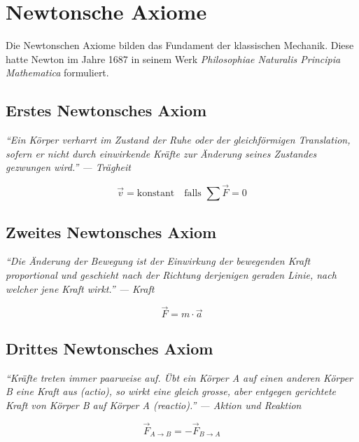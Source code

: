 \chapter{Newtonsche Axiome}
Die Newtonschen Axiome bilden das Fundament der klassischen Mechanik. Diese
hatte Newton im Jahre 1687 in seinem Werk 
\textit{Philosophiae Naturalis Principia Mathematica} formuliert. 

\newpage
\section{Erstes Newtonsches Axiom}
\textit{"`Ein Körper verharrt im Zustand der Ruhe oder der gleichförmigen 
Translation, sofern er nicht durch einwirkende Kräfte zur Änderung seines 
Zustandes gezwungen wird."' --- Trägheit}

\[ \boxed{\vec{v} = \text{konstant}} \quad \text{falls } \sum\vec{F}=0 \]

\section{Zweites Newtonsches Axiom} 
\textit{"`Die Änderung der Bewegung ist der Einwirkung der bewegenden Kraft 
proportional und geschieht nach der Richtung derjenigen geraden Linie, nach
welcher jene Kraft wirkt."' --- Kraft}

\[ \boxed{\vec{F} = m \cdot \vec{a}} \]

\section{Drittes Newtonsches Axiom}
\textit{"`Kräfte treten immer paarweise auf. Übt ein Körper A auf einen 
anderen Körper B eine Kraft aus (actio), so wirkt eine gleich grosse, aber
entgegen gerichtete Kraft von Körper B auf Körper A (reactio)."' --- 
Aktion und Reaktion}

\[ \boxed{\vec{F}_{A \rightarrow B} = - \vec{F}_{B \rightarrow A}} \]
